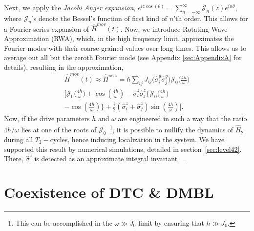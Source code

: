 \documentclass[%
nofootinbib,
reprint,
superscriptaddress,
amsmath,amssymb,showkeys,
aps,
prb,
]{revtex4-2}
\begin{document}
	Next, we apply the \textit{Jacobi Anger expansion}, $\displaystyle e^{iz \cos(\theta)} = \sum_{n=-\infty}^{\infty} \mathcal{J}_n(z) e^{in\theta}$, where $\mathcal{J}_n$'s denote the  Bessel's function of first kind of $n$'th order. This allows for a Fourier series expansion of $\hat{H}^{mov}(t)$. Now, we introduce Rotating Wave Approximation (RWA), which, in the high frequency limit, approximates the Fourier modes with their coarse-grained values over long times. This allows us to average out all but the zeroth Fourier mode (see Appendix \ref{sec:AppendixA} for details), resulting in the approximation,
		\begin{multline}
			\hat{H}^{mov}(t)\approx \hat{H}^{_{RWA}} = \hbar\sum_{ij} J_{ij} \Big(\hat{\sigma}^y_i\hat{\sigma}^y_j\Big) \mathcal{J}_0\Big(\frac{4h}{\omega}\Big)\\
			\Bigg[\mathcal{J}_0\Big(\frac{4h}{\omega}\Big) + \cos(\frac{4h}{\omega})-\hat{\sigma}^z_i\hat{\sigma}^z_j \bigg\{\mathcal{J}_0\Big(\frac{4h}{\omega}\Big)\\
			- \cos(\frac{4h}{\omega})\bigg\} + \frac{i}{2} (\hat{\sigma}^z_i + \hat{\sigma}^z_j) \sin(\frac{4h}{\omega})\Bigg].
			\label{eq:movham1}
	\end{multline}
	Now, if the drive parameters $h$ and $\omega$  are {engineered} in such a way that the ratio ${4h}/{\omega}$ lies at one of the roots of $\mathcal{J}_0$~\footnote{This can be accomplished in the $\omega \gg J_0$ limit by ensuring that $h\gg J_0$.}, it is possible to nullify the dynamics of $\hat{H}_2$ during all $T_2-$cycles, hence inducing localization in the system. We have supported this result by numerical simulations, detailed in section~\ref{sec:level42}. There, $\hat{\sigma}^z$ is detected as an approximate integral invariant ~\cite{Keser2016,Dodonov1978}. 
	
	
	\section{\label{sec:level3}Coexistence of DTC \& DMBL}
	
\end{document}
